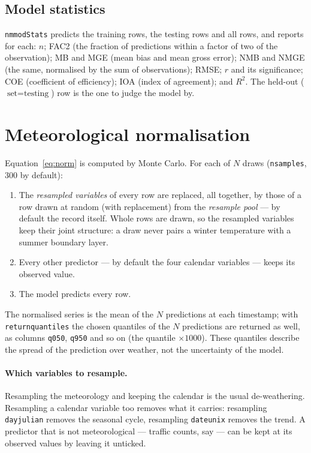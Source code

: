 \documentclass[11pt]{report}
\newcommand{\nosep}{\setlength{\itemsep}{0pt}\setlength{\parskip}{0pt}\setlength{\topsep}{2pt}}
\newcommand{\codeunderscore}{\textunderscore\allowbreak}
\newcommand{\code}[1]{\texttt{\let\_\codeunderscore #1}}
\begin{document}
\subsection{Model statistics}\label{sec:modstats}
\code{nm\_modStats} predicts the training rows, the testing rows and all rows, and reports
for each: $n$; FAC2 (the fraction of predictions within a factor of two of the
observation); MB and MGE (mean bias and mean gross error); NMB and NMGE (the same,
normalised by the sum of observations); RMSE; $r$ and its significance; COE (coefficient
of efficiency); IOA (index of agreement); and $R^2$. The held-out ($\text{set} =
\text{testing}$) row is the one to judge the model by.

\section{Meteorological normalisation}\label{sec:normalise}
Equation~\eqref{eq:norm} is computed by Monte Carlo. For each of $N$ draws
(\code{n\_samples}, 300 by default):
\begin{enumerate}\nosep
  \item The \emph{resampled variables} of every row are replaced, all together, by those
        of a row drawn at random (with replacement) from the \emph{resample pool} ---
        by default the record itself. Whole rows are drawn, so the resampled variables
        keep their joint structure: a draw never pairs a winter temperature with a
        summer boundary layer.
  \item Every other predictor --- by default the four calendar variables --- keeps its
        observed value.
  \item The model predicts every row.
\end{enumerate}
The normalised series is the mean of the $N$ predictions at each timestamp; with
\code{return\_quantiles} the chosen quantiles of the $N$ predictions are returned as
well, as columns \code{q050}, \code{q950} and so on (the quantile $\times 1000$). These
quantiles describe the spread of the prediction over weather, not the uncertainty of the
model.

\paragraph{Which variables to resample.} Resampling the meteorology and keeping the
calendar is the usual de-weathering. Resampling a calendar variable too removes what it
carries: resampling \code{day\_julian} removes the seasonal cycle, resampling
\code{date\_unix} removes the trend. A predictor that is not meteorological --- traffic
counts, say --- can be kept at its observed values by leaving it unticked.
\end{document}
